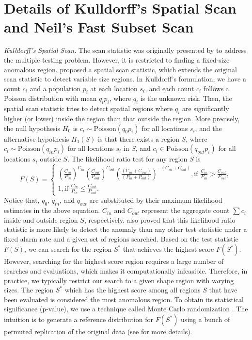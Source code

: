 \documentclass[11pt]{article}
\begin{document}
\section*{Details of Kulldorff's Spatial Scan and Neil's Fast Subset Scan}
\textit{Kulldorff's Spatial Scan.}
The scan statistic was originally presented by \citet{naus1965distribution} to address the multiple testing problem. However, it is restricted to finding a fixed-size anomalous region. \citet{kulldorff1995spatial} proposed a spatial scan statistic, which extends the original scan statistic to detect variable size regions. In Kulldorff's formulation, we have a count $c_i$ and a population $p_i$ at each location $s_i$, and each count $c_i$ follows a Poisson distribution with mean $q_ip_i$, where $q_i$ is the unknown risk. Then, the spatial scan statistic tries to detect spatial regions where $q_i$ are significantly higher (or lower) inside the region than that outside the region. More precisely,  the null hypothesis $H_0$ is $c_i\sim \mbox{Poisson}(q_{0}p_i)$ for all locations $s_i$, and the alternative hypothesis $H_1(S)$ is that there exists a region $S$, where $c_i\sim \mbox{Poisson}(q_{in}p_i)$ for all locations $s_i$ in $S$, and $c_i\in \mbox{Poisson}(q_{out}p_i)$ for all locations $s_i$ outside $S$.  The likelihood ratio test for any region $S$ is 
\begin{equation}
	F(S)=
\begin{cases}
    (\frac{C_{in}}{P_{in}})^{C_{in}}(\frac{C_{out}}{P_{out}})^{C_{out}}(\frac{(C_{in}+C_{out})}{(P_{in}+P_{out})})^{-(C_{in}+C_{out})}, \mbox{if } \frac{C_{in}}{P_{in}}>\frac{C_{out}}{P_{out}}, \\
    1, \mbox{if }\frac{C_{in}}{P_{in}}\leq \frac{C_{out}}{P_{out}}.
\end{cases}
\end{equation}
Notice that, $q_{0}$, $q_{in}$, and $q_{out}$ are substituted by their maximum likelihood estimates in the above equation. $C_{in}$ and $C_{out}$ represent the aggregate count $\sum c_i$ inside and outside region $S$, respectively. \citet{kulldorff1997spatial} also proved that this likelihood ratio statistic is more likely to detect the anomaly than any other test statistic under a fixed alarm rate and a given set of regions searched. Based on the test statistic $F(S)$, we can search for the region $S^*$ that achieves the highest score $F(S^*)$. However, searching for the highest score region requires a large number of searches and evaluations, which makes it computationally infeasible. Therefore, in practice, we typically restrict our search to a given shape region with varying sizes. The region $S^*$ which has the highest score among all regions $S$ that have been evaluated is considered the most anomalous region. To obtain its statistical significance (p-value), we use a technique called Monte Carlo randomization \citep{dwass1957modified}. The intuition is to generate a reference distribution for $F(S^*)$ using a bunch of permuted replication of the original data (see \citet{kulldorff2005space} for more details).
\end{document}
